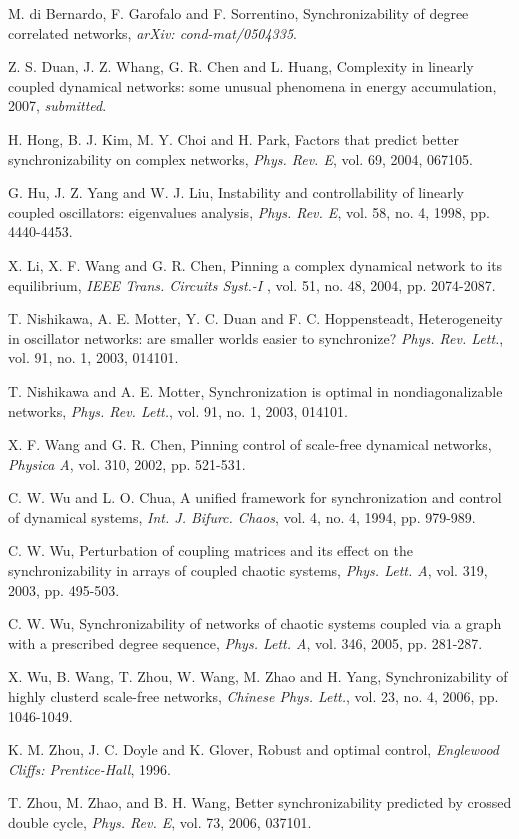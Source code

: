 \documentclass[11pt]{article}
\begin{document}
\begin{thebibliography}{99}

M. di Bernardo, F. Garofalo and F. Sorrentino, Synchronizability of
degree correlated networks, {\it arXiv: cond-mat/0504335}.

Z. S. Duan, J. Z. Whang, G. R. Chen and L. Huang, Complexity in
linearly coupled dynamical networks: some unusual phenomena in
energy accumulation, 2007, {\it submitted}.

H. Hong, B. J. Kim, M. Y. Choi and H. Park, Factors that predict
better synchronizability on complex networks, {\it Phys. Rev. E},
vol. 69, 2004, 067105.



G. Hu, J. Z. Yang and W. J. Liu, Instability and controllability of
linearly coupled oscillators: eigenvalues analysis, {\it Phys. Rev.
E}, vol. 58, no. 4, 1998, pp. 4440-4453.

X. Li, X. F. Wang and G. R. Chen, Pinning a complex dynamical
network to its equilibrium, {\it IEEE Trans. Circuits Syst.-I },
vol. 51, no. 48, 2004, pp. 2074-2087.

T. Nishikawa, A. E. Motter, Y. C. Duan and F. C. Hoppensteadt,
Heterogeneity in oscillator networks: are smaller worlds easier to
synchronize? {\it Phys. Rev. Lett.}, vol. 91, no. 1, 2003, 014101.

T. Nishikawa and A. E. Motter, Synchronization is optimal in
nondiagonalizable networks, {\it Phys. Rev. Lett.}, vol. 91, no. 1,
2003, 014101.

X. F. Wang and G. R. Chen, Pinning control of scale-free dynamical
networks, {\it Physica A}, vol. 310, 2002, pp. 521-531.

C. W. Wu and L. O. Chua, A unified framework for synchronization and
control of dynamical systems, {\it Int. J. Bifurc. Chaos}, vol. 4,
no. 4, 1994, pp. 979-989.

C. W. Wu, Perturbation of coupling matrices and its effect on the
synchronizability in arrays of coupled chaotic systems, {\it Phys.
Lett. A}, vol. 319, 2003, pp. 495-503.

C. W. Wu, Synchronizability of networks of chaotic systems coupled
via a graph with a prescribed degree sequence, {\it Phys. Lett. A},
vol. 346, 2005, pp. 281-287.

X. Wu, B. Wang, T. Zhou, W. Wang, M. Zhao and H. Yang,
Synchronizability of highly clusterd scale-free networks, {\it
Chinese Phys. Lett.}, vol. 23, no. 4, 2006, pp. 1046-1049.

K. M. Zhou, J. C. Doyle and K. Glover, Robust and optimal control,
{\it Englewood Cliffs: Prentice-Hall}, 1996.

T. Zhou, M. Zhao, and B. H. Wang, Better synchronizability predicted
by crossed double cycle, {\it Phys. Rev. E}, vol. 73, 2006, 037101.




\end{thebibliography}
\end{document}

